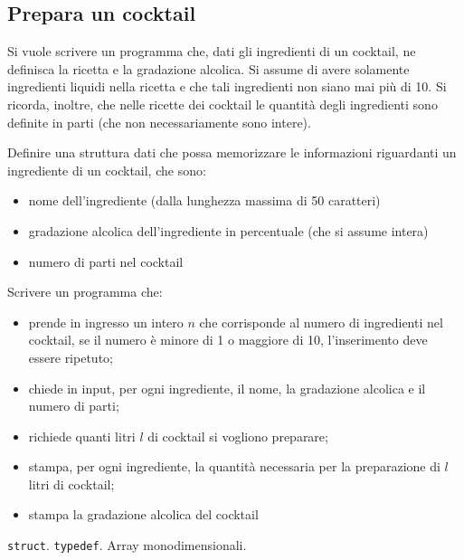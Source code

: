 \subsection{Prepara un cocktail}

Si vuole scrivere un programma che, dati gli ingredienti di un cocktail, ne definisca la ricetta e la gradazione alcolica.
Si assume di avere solamente ingredienti liquidi nella ricetta e che tali ingredienti non siano mai pi\`u di 10.
Si ricorda, inoltre, che nelle ricette dei cocktail le quantit\`a degli ingredienti sono definite in parti (che non necessariamente sono intere).

Definire una struttura dati che possa memorizzare le informazioni riguardanti un ingrediente di un cocktail, che sono:
\begin{itemize}
    \item nome dell'ingrediente (dalla lunghezza massima di 50 caratteri)
    \item gradazione alcolica dell'ingrediente in percentuale (che si assume intera)
    \item numero di parti nel cocktail
\end{itemize}

Scrivere un programma che:
\begin{itemize}
    \item prende in ingresso un intero $n$ che corrisponde al numero di ingredienti nel cocktail,
      se il numero \`e minore di 1 o maggiore di 10, l'inserimento deve essere ripetuto;
    \item chiede in input, per ogni ingrediente, il nome, la gradazione alcolica e il numero di parti;
    \item richiede quanti litri $l$ di cocktail si vogliono preparare;
    \item stampa, per ogni ingrediente, la quantit\`a necessaria per la preparazione di $l$ litri di cocktail;
    \item stampa la gradazione alcolica del cocktail
\end{itemize}

\begin{tags}
\texttt{struct}. \texttt{typedef}. Array monodimensionali.
\end{tags}


